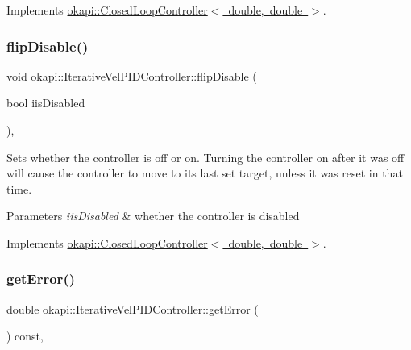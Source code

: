 Implements \mbox{\hyperlink{classokapi_1_1ClosedLoopController_a9de69b60885df41cd2164fe1a23f34d3}{okapi\+::\+Closed\+Loop\+Controller$<$ double, double $>$}}.

\mbox{\label{classokapi_1_1IterativeVelPIDController_a6bd2a04813b0fd99f0904808ff963f28}} 
\subsubsection{\texorpdfstring{flipDisable()}{flipDisable()}\hspace{0.1cm}{\footnotesize\ttfamily [2/2]}}
{\footnotesize\ttfamily void okapi\+::\+Iterative\+Vel\+P\+I\+D\+Controller\+::flip\+Disable (\begin{DoxyParamCaption}\item[{bool}]{iis\+Disabled }\end{DoxyParamCaption})\hspace{0.3cm}{\ttfamily [override]}, {\ttfamily [virtual]}}

Sets whether the controller is off or on. Turning the controller on after it was off will cause the controller to move to its last set target, unless it was reset in that time.


\begin{DoxyParams}{Parameters}
{\em iis\+Disabled} & whether the controller is disabled \\
\hline
\end{DoxyParams}


Implements \mbox{\hyperlink{classokapi_1_1ClosedLoopController_a768cd1db40ce9cd5c89b20be6e838ccc}{okapi\+::\+Closed\+Loop\+Controller$<$ double, double $>$}}.

\mbox{\label{classokapi_1_1IterativeVelPIDController_a7e60b432a91d73db0a62c5d31759ed10}} 
\subsubsection{\texorpdfstring{getError()}{getError()}}
{\footnotesize\ttfamily double okapi\+::\+Iterative\+Vel\+P\+I\+D\+Controller\+::get\+Error (\begin{DoxyParamCaption}{ }\end{DoxyParamCaption}) const\hspace{0.3cm}{\ttfamily [override]}, {\ttfamily [virtual]}}

